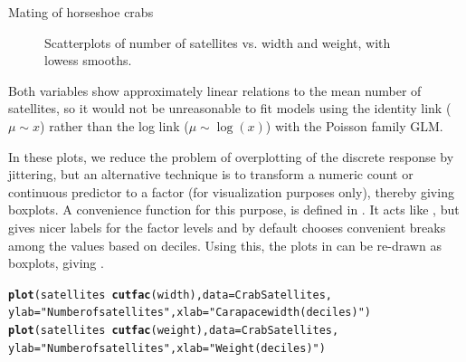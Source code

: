 \documentclass[11pt]{book}\usepackage[]{graphicx}\usepackage[]{color}
\makeatletter
\newcommand{\hlstr}[1]{\textcolor[rgb]{0.192,0.494,0.8}{#1}}%
\newcommand{\hlopt}[1]{\textcolor[rgb]{0,0,0}{#1}}%
\newcommand{\hlstd}[1]{\textcolor[rgb]{0.345,0.345,0.345}{#1}}%
\newcommand{\hlkwc}[1]{\textcolor[rgb]{0.333,0.667,0.333}{#1}}%
\newcommand{\hlkwd}[1]{\textcolor[rgb]{0.737,0.353,0.396}{\textbf{#1}}}%
\newenvironment{kframe}{%
 \def\at@end@of@kframe{}%
 \ifinner\ifhmode%
  \def\at@end@of@kframe{\end{minipage}}%
  \begin{minipage}{\columnwidth}%
 \fi\fi%
 \def\FrameCommand##1{\hskip\@totalleftmargin \hskip-\fboxsep
 \colorbox{shadecolor}{##1}\hskip-\fboxsep
     \hskip-\linewidth \hskip-\@totalleftmargin \hskip\columnwidth}%
 \MakeFramed {\advance\hsize-\width
   \@totalleftmargin\z@ \linewidth\hsize
   \@setminipage}}%
 {\par\unskip\endMakeFramed%
 \at@end@of@kframe}
\newenvironment{knitrout}{}{} %
\renewenvironment{knitrout}{\small\renewcommand{\baselinestretch}{.85}}{} %
\makeatother
\begin{document}
\begin{Example}[crabs1]{Mating of horseshoe crabs}
\begin{knitrout}
\begin{figure}[!htbp]
\caption[Scatterplots of number of satellites vs]{Scatterplots of number of satellites vs. width and weight, with lowess smooths.\label{fig:crabs1-scats}}
\end{figure}


\end{knitrout}
Both variables show approximately linear relations to the mean number of satellites, so it
would not be unreasonable to fit models using the identity link ($\mu \sim x$) rather than the log link
($\mu \sim \log(x)$) with the Poisson family GLM.

In these plots, we reduce the problem of overplotting of the discrete response by jittering, but
an alternative technique is to transform a numeric count or continuous predictor to
a factor (for visualization purposes only), thereby giving boxplots.  A convenience function for
this purpose,  is defined in .  
It acts like , but gives nicer labels
for the factor levels and by default chooses convenient breaks among the values based on deciles.
Using this, the plots in  can be re-drawn as boxplots, giving .




\begin{knitrout}
\color{fgcolor}\begin{kframe}
\begin{alltt}
\hlkwd{plot}\hlstd{(satellites} \hlopt{~} \hlkwd{cutfac}\hlstd{(width),} \hlkwc{data}\hlstd{=CrabSatellites,}
     \hlkwc{ylab}\hlstd{=}\hlstr{"Number of satellites"}\hlstd{,} \hlkwc{xlab}\hlstd{=}\hlstr{"Carapace width (deciles)"}\hlstd{)}
\hlkwd{plot}\hlstd{(satellites} \hlopt{~} \hlkwd{cutfac}\hlstd{(weight),} \hlkwc{data}\hlstd{=CrabSatellites,}
     \hlkwc{ylab}\hlstd{=}\hlstr{"Number of satellites"}\hlstd{,} \hlkwc{xlab}\hlstd{=}\hlstr{"Weight (deciles)"}\hlstd{)}
\end{alltt}
\end{kframe}\begin{figure}[!htbp]


\end{figure}
\end{knitrout}
\end{Example}
\end{document}
